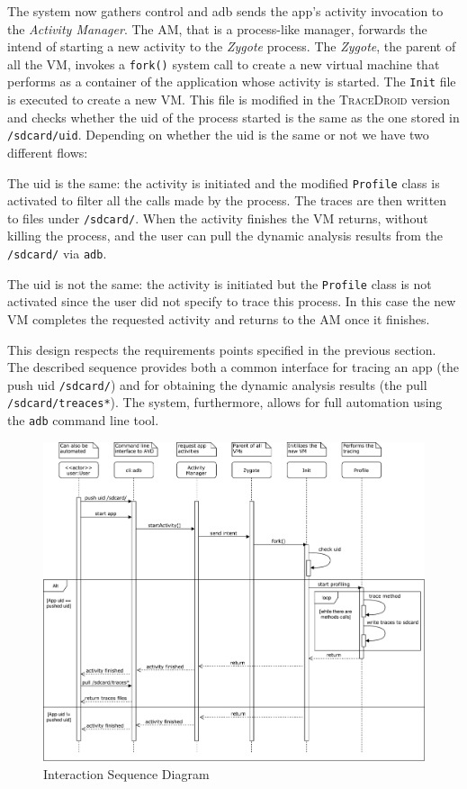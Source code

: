 The system now gathers control and adb sends the app's activity
invocation to the \textit{Activity Manager}. The AM, that is a process-like
manager, forwards the intend of starting a new activity to the \emph{Zygote}
process. The \emph{Zygote}, the parent of all the VM, invokes a \texttt{fork()} system
call to create a new virtual machine that performs as a container of
the application whose activity is started. The \texttt{Init} file is executed
to create a new VM. This file is modified in the \textsc{TraceDroid} version
and checks whether the uid of the process started is the same as the
one stored in \texttt{/sdcard/uid}. Depending on whether the uid is the same or
not we have two different flows:
\begin{enumerate*}
  \item The uid is the same: the activity is initiated and the modified \texttt{Profile} class is activated to filter all the calls made by the process. The traces are then written to files under \texttt{/sdcard/}. When the activity finishes the VM returns, without killing the process, and the user can pull the dynamic analysis results from the \texttt{/sdcard/} via \texttt{adb}. 
  \item The uid is not the same: the activity is initiated but the \texttt{Profile} class is not activated since the user did not specify to trace this process. In this case the new VM completes the requested activity and returns to the AM once it finishes. 
\end{enumerate*}

This design respects the requirements points specified in the previous
section. The described sequence provides both a common interface for
tracing an app (the push uid \texttt{/sdcard/}) and for obtaining the dynamic
analysis results (the pull \texttt{/sdcard/treaces*}). The system, furthermore,
allows for full automation using the \texttt{adb} command line tool.

\begin{figure}[!h]
    \centering
    \includegraphics[width=15cm]{./img/design/interaction.pdf}
    \caption{Interaction Sequence Diagram}
    \label{fig:scope_interaction}
\end{figure}
